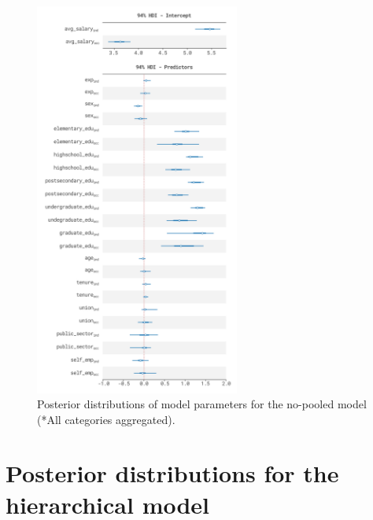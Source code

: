 \begin{figure}[H]
    \centering
    \includegraphics[width=0.6\textwidth]{images/appendix/no_pooled.png}
    \caption{Posterior distributions of model parameters for the no-pooled model (*All categories aggregated).}
    \label{fig:posterior_dists_nopooled}
\end{figure}

\section{Posterior distributions for the hierarchical model}


